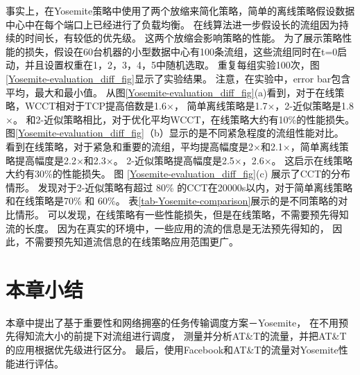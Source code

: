 事实上，在Yosemite策略中使用了两个放缩来简化策略，简单的离线策略假设数据中心中在每个端口上已经进行了负载均衡。
在线算法进一步假设长的流组因为持续的时间长，有较低的优先级。
这两个放缩会影响策略的性能。
为了展示策略性能的损失，假设在60台机器的小型数据中心有100条流组，这些流组同时在t=0启动，并且设置权重在1，2，3，4，5中随机选取。
重复每组实验100次，图\ref{Yosemite-evaluation_diff_fig}显示了实验结果。
注意，在实验中，error bar包含平均，最大和最小值。
从图\ref{Yosemite-evaluation_diff_fig}(a)看到，对于在线策略，WCCT相对于TCP提高倍数是1.6$\times$，
简单离线策略是1.7$\times$，2-近似策略是1.8$\times$。
和2-近似策略相比，对于优化平均WCCT，在线策略大约有10\%的性能损失。
图\ref{Yosemite-evaluation_diff_fig}（b）显示的是不同紧急程度的流组性能对比。
看到在线策略，对于紧急和重要的流组，平均提高幅度是2$\times$和2.1$\times$，简单离线策略提高幅度是2.2$\times$和2.3$\times$。
2-近似策略提高幅度是2.5$\times$，2.6$\times$。
这启示在线策略大约有30\%的性能损失。
图 \ref{Yosemite-evaluation_diff_fig}(c) 展示了CCT的分布情形。
发现对于2-近似策略有超过 80\% 的CCT在20000s以内，对于简单离线策略和在线策略是70\% 和 60\%。
表\ref{tab-Yosemite-comparison}展示的是不同策略的对比情形。
可以发现，在线策略有一些性能损失，但是在线策略，不需要预先得知流的长度。
因为在真实的环境中，一些应用的流的信息是无法预先得知的，
因此，不需要预先知道流信息的在线策略应用范围更广。


\section{本章小结}
本章中提出了基于重要性和网络拥塞的任务传输调度方案－Yosemite，
在不用预先得知流大小的前提下对流组进行调度，
测量并分析AT\&T的流量，并把AT\&T的应用根据优先级进行区分。
最后，使用Facebook和AT\&T的流量对Yosemite性能进行评估。



